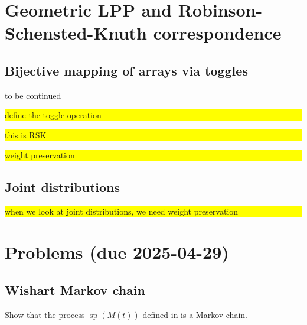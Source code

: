 \documentclass[letterpaper,11pt,oneside,reqno]{article}
\numberwithin{equation}{section}
\theoremstyle{definition}
\begin{document}
\section{Geometric LPP and Robinson-Schensted-Knuth correspondence}

\subsection{Bijective mapping of arrays via toggles}
\label{sub:toggle}

\colorbox{red!60!white}{\parbox{.7\textwidth}{to be continued}}

\colorbox{yellow}{\parbox{.7\textwidth}{define the toggle operation}}

\colorbox{yellow}{\parbox{.7\textwidth}{this is RSK}}

\colorbox{yellow}{\parbox{.7\textwidth}{weight preservation}}

\subsection{Joint distributions}
\label{sub:joint}

\colorbox{yellow}{\parbox{.7\textwidth}{when we look at joint distributions,
we need weight preservation}}


































\appendix
\setcounter{section}{12}

\section{Problems (due 2025-04-29)}

\subsection{Wishart Markov chain}
\label{prob:Markov}

Show that the
process $\operatorname{sp}(M(t))$
defined in 
is a Markov chain.
\end{document}
